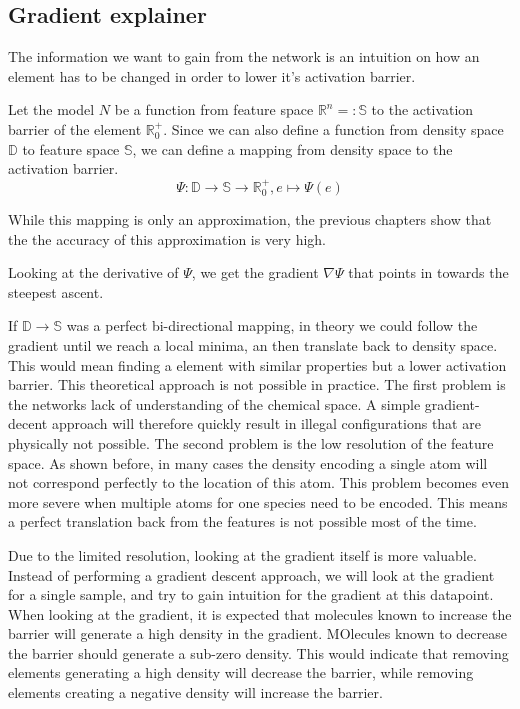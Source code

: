 \subsection{Gradient explainer}

The information we want to gain from the network is an intuition on
how an element has to be changed in order to lower it's activation barrier.

Let the model $N$ be a function from feature space $\mathbb{R}^n =: \mathbb{S}$ to the activation barrier of the element $\mathbb{R}^+_0$.
Since we can also define a function from density space $\mathbb{D}$ to feature space $\mathbb{S}$,
we can define a mapping from density space to the activation barrier.
$$ \Psi : \mathbb{D} \to \mathbb{S} \to \mathbb{R}^+_0, e \mapsto \Psi(e) $$

While this mapping is only an approximation, the previous chapters show that the 
the accuracy of this approximation is very high.

Looking at the derivative of $\Psi$, we get the gradient $\nabla \Psi$ that points in towards the steepest ascent.

If $\mathbb{D} \to \mathbb{S}$ was a perfect bi-directional mapping, in theory we could follow the gradient until we reach 
a local minima, an then translate back to density space.
This would mean finding a element with similar properties but a lower activation barrier.
This theoretical approach is not possible in practice.
The first problem is the networks lack of understanding of the chemical space.
A simple gradient-decent approach will therefore quickly result in illegal configurations 
that are physically not possible.
The second problem is the low resolution of the feature space.
As shown before, in many cases the density encoding a single atom will not correspond perfectly to the location of this atom.
This problem becomes even more severe when multiple atoms for one species need to be encoded.
This means a perfect translation back from the features is not possible most of the time.

Due to the limited resolution, looking at the gradient itself is more valuable.
Instead of performing a gradient descent approach, we will look at the gradient for a single sample,
and try to gain intuition for the gradient at this datapoint.
When looking at the gradient, it is expected that molecules known to increase the barrier will generate a high density in the gradient.
MOlecules known to decrease the barrier should generate a sub-zero density.
This would indicate that removing elements generating a high density will decrease the barrier,
while removing elements creating a negative density will increase the barrier.

